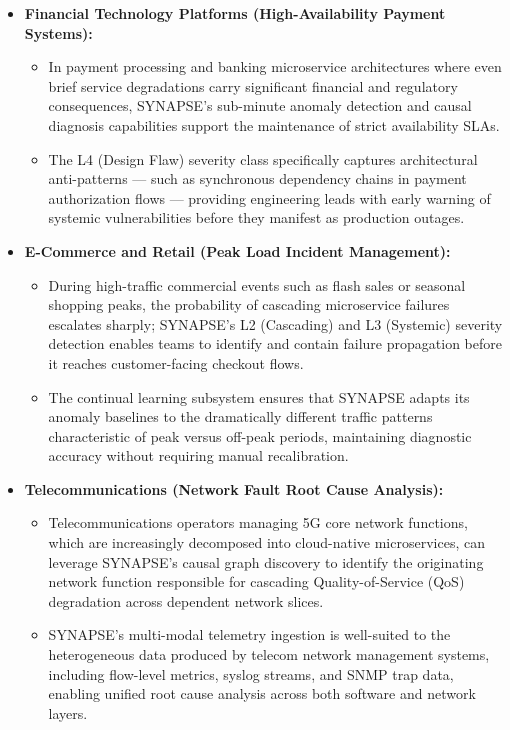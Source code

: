 \begin{itemize}
    \item \textbf{Financial Technology Platforms (High-Availability Payment Systems):}
    \begin{itemize}
        \item In payment processing and banking microservice architectures where even brief service degradations carry significant financial and regulatory consequences, SYNAPSE's sub-minute anomaly detection and causal diagnosis capabilities support the maintenance of strict availability SLAs.
        \item The L4 (Design Flaw) severity class specifically captures architectural anti-patterns — such as synchronous dependency chains in payment authorization flows — providing engineering leads with early warning of systemic vulnerabilities before they manifest as production outages.
    \end{itemize}

    \item \textbf{E-Commerce and Retail (Peak Load Incident Management):}
    \begin{itemize}
        \item During high-traffic commercial events such as flash sales or seasonal shopping peaks, the probability of cascading microservice failures escalates sharply; SYNAPSE's L2 (Cascading) and L3 (Systemic) severity detection enables teams to identify and contain failure propagation before it reaches customer-facing checkout flows.
        \item The continual learning subsystem ensures that SYNAPSE adapts its anomaly baselines to the dramatically different traffic patterns characteristic of peak versus off-peak periods, maintaining diagnostic accuracy without requiring manual recalibration.
    \end{itemize}

    \item \textbf{Telecommunications (Network Fault Root Cause Analysis):}
    \begin{itemize}
        \item Telecommunications operators managing 5G core network functions, which are increasingly decomposed into cloud-native microservices, can leverage SYNAPSE's causal graph discovery to identify the originating network function responsible for cascading Quality-of-Service (QoS) degradation across dependent network slices.
        \item SYNAPSE's multi-modal telemetry ingestion is well-suited to the heterogeneous data produced by telecom network management systems, including flow-level metrics, syslog streams, and SNMP trap data, enabling unified root cause analysis across both software and network layers.
    \end{itemize}


\end{itemize}
